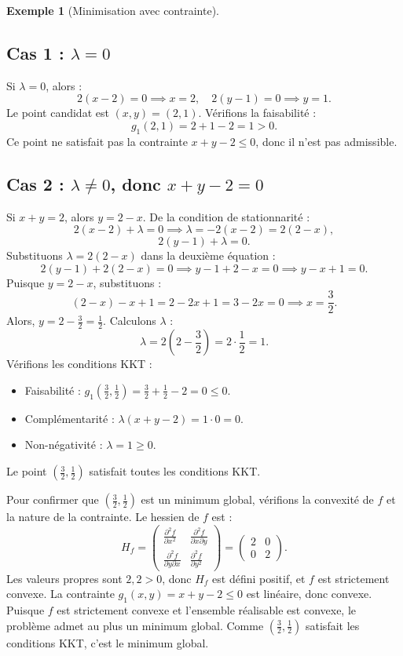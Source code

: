 \documentclass[a4paper,12pt,openany]{book}
\theoremstyle{plain}
\theoremstyle{definition}
\newtheorem{example}[theorem]{Exemple}
\theoremstyle{remark}
\theoremstyle{nbstyle}
\begin{document}
\begin{example}[Minimisation avec contrainte]
	\subsection*{Cas 1 : \(\lambda = 0\)}
	Si \(\lambda = 0\), alors :
	\[
	2(x - 2) = 0 \implies x = 2, \quad 2(y - 1) = 0 \implies y = 1.
	\]
	Le point candidat est \((x, y) = (2, 1)\). Vérifions la faisabilité :
	\[
	g_1(2, 1) = 2 + 1 - 2 = 1 > 0.
	\]
	Ce point ne satisfait pas la contrainte \(x + y - 2 \leq 0\), donc il n'est pas admissible.
	
	\subsection*{Cas 2 : \(\lambda \neq 0\), donc \(x + y - 2 = 0\)}
	Si \(x + y = 2\), alors \(y = 2 - x\). De la condition de stationnarité :
	\[
	2(x - 2) + \lambda = 0 \implies \lambda = -2(x - 2) = 2(2 - x),
	\]
	\[
	2(y - 1) + \lambda = 0.
	\]
	Substituons \(\lambda = 2(2 - x)\) dans la deuxième équation :
	\[
	2(y - 1) + 2(2 - x) = 0 \implies y - 1 + 2 - x = 0 \implies y - x + 1 = 0.
	\]
	Puisque \(y = 2 - x\), substituons :
	\[
	(2 - x) - x + 1 = 2 - 2x + 1 = 3 - 2x = 0 \implies x = \frac{3}{2}.
	\]
	Alors, \(y = 2 - \frac{3}{2} = \frac{1}{2}\). Calculons \(\lambda\) :
	\[
	\lambda = 2\left(2 - \frac{3}{2}\right) = 2 \cdot \frac{1}{2} = 1.
	\]
	Vérifions les conditions KKT :
	\begin{itemize}
		\item Faisabilité : \(g_1\left(\frac{3}{2}, \frac{1}{2}\right) = \frac{3}{2} + \frac{1}{2} - 2 = 0 \leq 0\).
		\item Complémentarité : \(\lambda (x + y - 2) = 1 \cdot 0 = 0\).
		\item Non-négativité : \(\lambda = 1 \geq 0\).
	\end{itemize}
	Le point \(\left(\frac{3}{2}, \frac{1}{2}\right)\) satisfait toutes les conditions KKT.
	
	Pour confirmer que \(\left(\frac{3}{2}, \frac{1}{2}\right)\) est un minimum global, vérifions la convexité de \(f\) et la nature de la contrainte. Le hessien de \(f\) est :
	\[
	H_f = \begin{pmatrix}
	\frac{\partial^2 f}{\partial x^2} & \frac{\partial^2 f}{\partial x \partial y} \\
	\frac{\partial^2 f}{\partial y \partial x} & \frac{\partial^2 f}{\partial y^2}
	\end{pmatrix} = \begin{pmatrix}
	2 & 0 \\
	0 & 2
	\end{pmatrix}.
	\]
	Les valeurs propres sont \(2, 2 > 0\), donc \(H_f\) est défini positif, et \(f\) est strictement convexe. La contrainte \(g_1(x, y) = x + y - 2 \leq 0\) est linéaire, donc convexe. Puisque \(f\) est strictement convexe et l'ensemble réalisable est convexe, le problème admet au plus un minimum global. Comme \(\left(\frac{3}{2}, \frac{1}{2}\right)\) satisfait les conditions KKT, c'est le minimum global.
	

\end{example}
\end{document}
